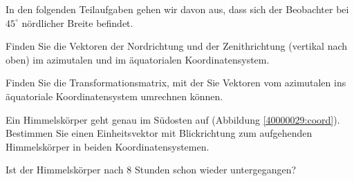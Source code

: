 In den folgenden Teilaufgaben gehen wir davon aus, dass sich der Beobachter
bei $45^\circ$ nördlicher Breite befindet.
\begin{teilaufgaben}
\item Finden Sie die Vektoren der Nordrichtung und der Zenithrichtung
(vertikal nach oben) im azimutalen und im äquatorialen Koordinatensystem.
\item Finden Sie die Transformationsmatrix, mit der Sie Vektoren
vom azimutalen ins äquatoriale Koordinatensystem umrechnen können.
\item Ein Himmelskörper geht genau im Südosten auf
(Abbildung \ref{40000029:coord}).
Bestimmen Sie einen Einheitsvektor mit Blickrichtung zum
aufgehenden Himmelskörper in beiden Koordinatensystemen.
\item Ist der Himmelskörper nach 8 Stunden schon wieder untergegangen?
\end{teilaufgaben}

